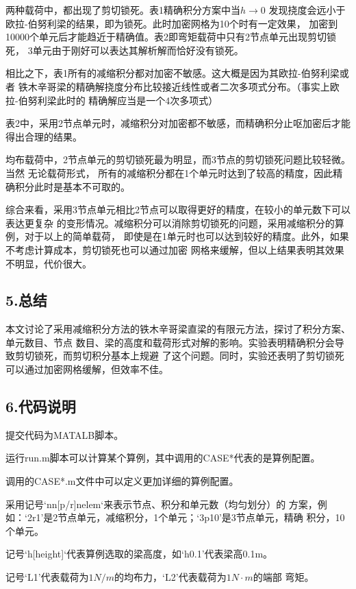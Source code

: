 \documentclass[UTF8,c5size]{ctexart}
\begin{document}
两种载荷中，都出现了剪切锁死。表1精确积分方案中当$h\rightarrow0$
发现挠度会远小于欧拉-伯努利梁的结果，即为锁死。此时加密网格为10个时有一定效果，
加密到10000个单元后才能趋近于精确值。表2即弯矩载荷中只有2节点单元出现剪切锁死，
3单元由于刚好可以表达其解析解而恰好没有锁死。

相比之下，表1所有的减缩积分都对加密不敏感。这大概是因为其欧拉-伯努利梁或者
铁木辛哥梁的精确解挠度分布比较接近线性或者二次多项式分布。（事实上欧拉-伯努利梁此时的
精确解应当是一个4次多项式）

表2中，采用2节点单元时，减缩积分对加密都不敏感，而精确积分止呕加密后才能得出合理的结果。

均布载荷中，2节点单元的剪切锁死最为明显，而3节点的剪切锁死问题比较轻微。当然
无论载荷形式，
所有的减缩积分都在1个单元时达到了较高的精度，因此精确积分此时是基本不可取的。

综合来看，采用3节点单元相比2节点可以取得更好的精度，在较小的单元数下可以表达更复杂
的变形情况。减缩积分可以消除剪切锁死的问题，采用减缩积分的算例，对于以上的简单载荷，
即使是在1单元时也可以达到较好的精度。此外，如果不考虑计算成本，剪切锁死也可以通过加密
网格来缓解，但以上结果表明其效果不明显，代价很大。

\subsection*{5.总结}

本文讨论了采用减缩积分方法的铁木辛哥梁直梁的有限元方法，探讨了积分方案、单元数目、节点
数目、梁的高度和载荷形式对解的影响。实验表明精确积分会导致剪切锁死，而剪切积分基本上规避
了这个问题。同时，实验还表明了剪切锁死可以通过加密网格缓解，但效率不佳。

\subsection*{6.代码说明}

提交代码为MATALB脚本。

运行run.m脚本可以计算某个算例，其中调用的CASE*代表的是算例配置。

调用的CASE*.m文件中可以定义更加详细的算例配置。

采用记号‘nn[p/r]nelem‘来表示节点、积分和单元数（均匀划分）的
方案，例如：‘2r1’是2节点单元，减缩积分，1个单元；‘3p10’是3节点单元，精确
积分，10个单元。

记号‘h[height]‘代表算例选取的梁高度，如‘h0.1’代表梁高0.1m。

记号‘L1’代表载荷为$1N/m$的均布力，‘L2’代表载荷为$1N\cdot m$的端部
弯矩。
\end{document}
